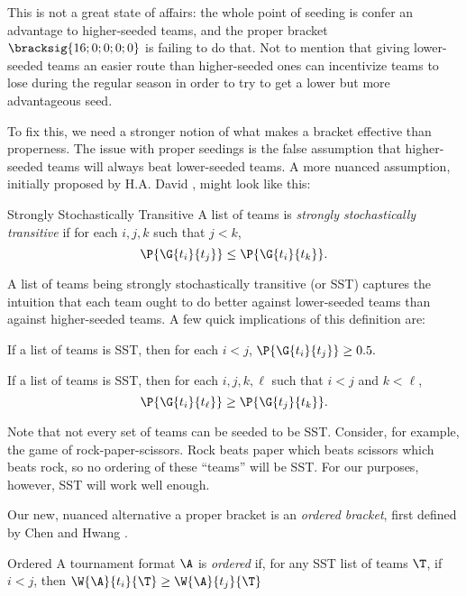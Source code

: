 {This is not a great state of affairs: the whole point of seeding is confer an advantage to higher-seeded teams, and the proper bracket $\bracksig{16; 0; 0; 0; 0}$ is failing to do that. Not to mention that giving lower-seeded teams an easier route than higher-seeded ones can incentivize teams to lose during the regular season in order to try to get a lower but more advantageous seed.

To fix this, we need a stronger notion of what makes a bracket effective than properness. The issue with proper seedings is the false assumption that higher-seeded teams will always beat lower-seeded teams. A more nuanced assumption, initially proposed by H.A. David \cite{stochastic}, might look like this:

\begin{definition}{Strongly Stochastically Transitive}{}
    A list of teams is \textit{strongly stochastically transitive} if for each $i, j, k$ such that $j < k$, $$\P{\G{t_i}{t_j}} \leq \P{\G{t_i}{t_k}}.$$
\end{definition}

A list of teams being strongly stochastically transitive (or SST) captures the intuition that each team ought to do better against lower-seeded teams than against higher-seeded teams. A few quick implications of this definition are:

\begin{corollary}{}{}
    If a list of teams is SST, then for each $i < j$, $\P{\G{t_i}{t_j}} \geq 0.5.$
\end{corollary}

\begin{corollary}{}{}
    If a list of teams is SST, then for each $i, j, k, \ell$ such that $i < j$ and $k < \ell$, $$\P{\G{t_i}{t_\ell}} \geq \P{\G{t_j}{t_k}}.$$
\end{corollary}

Note that not every set of teams can be seeded to be SST. Consider, for example, the game of rock-paper-scissors. Rock beats paper which beats scissors which beats rock, so no ordering of these ``teams'' will be SST. For our purposes, however, SST will work well enough.

Our new, nuanced alternative a proper bracket is an \textit{ordered bracket}, first defined by Chen and Hwang \cite{define_ordered}.

\begin{definition}{Ordered}{}
    A tournament format $\A$ is \textit{ordered} if, for any SST list of teams $\T$, if $i < j$, then $\W{\A}{t_i}{\T} \geq \W{\A}{t_j}{\T} $
\end{definition}

}
